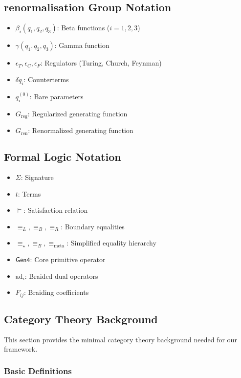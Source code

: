\subsection{renormalisation Group Notation}
\begin{itemize}
\item $\beta_i(q_1,q_2,q_3)$: Beta functions ($i = 1,2,3$)
\item $\gamma(q_1,q_2,q_3)$: Gamma function
\item $\epsilon_T, \epsilon_C, \epsilon_F$: Regulators (Turing, Church, Feynman)
\item $\delta q_i$: Counterterms
\item $q_i^{(0)}$: Bare parameters
\item $G_{\text{reg}}$: Regularized generating function
\item $G_{\text{ren}}$: Renormalized generating function
\end{itemize}

\subsection{Formal Logic Notation}
\begin{itemize}
\item $\Sigma$: Signature
\item $t$: Terms
\item $\models$: Satisfaction relation
\item $\equiv_L, \equiv_B, \equiv_R$: Boundary equalities
\item $\equiv_\star, \equiv_B, \equiv_{\text{meta}}$: Simplified equality hierarchy
\item $\mathsf{Gen4}$: Core primitive operator
\item $\text{ad}_i$: Braided dual operators
\item $F_{ij}$: Braiding coefficients
\end{itemize}

\subsection{Category Theory Background}

This section provides the minimal category theory background \cite{maclane1971,lambek1968,karoubi1970,eilenberg1965,street1972} needed for our framework.

\subsubsection{Basic Definitions}

